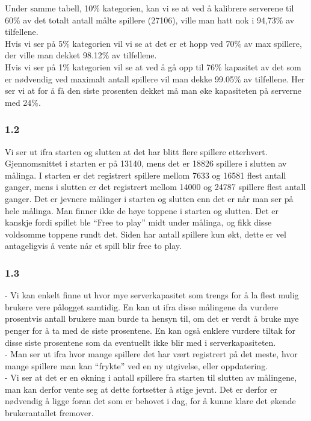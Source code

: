 \documentclass[a4paper, norsk, 12pt]{article}
\begin{document}
Under samme tabell, 10\% kategorien, kan vi se at ved å kalibrere serverene til 60\% av det totalt antall målte spillere (27106), ville man hatt nok i 94,73\% av tilfellene. \\

Hvis vi ser på 5\% kategorien vil vi se at det er et hopp ved 70\% av max spillere, der ville man dekket 98.12\% av tilfellene. \\

Hvis vi ser på 1\% kategorien vil se at ved å gå opp til 76\% kapasitet av det som er nødvendig ved maximalt antall spillere vil man dekke 99.05\% av tilfellene. Her ser vi at for å få den siste prosenten dekket må man øke kapasiteten på serverne med 24\%.

\subsubsection*{1.2}
Vi ser ut ifra starten og slutten at det har blitt flere spillere etterhvert. Gjennomsnittet i starten er på 13140, mens det er 18826 spillere i slutten av målinga. I starten er det registrert spillere mellom 7633 og 16581 flest antall ganger, mens i slutten er det registrert mellom 14000 og 24787 spillere flest antall ganger. Det er jevnere målinger i starten og slutten enn det er når man ser på hele målinga.  Man finner ikke de høye toppene i starten og slutten. Det er kanskje fordi spillet ble “Free to play” midt under målinga, og fikk disse voldsomme toppene rundt det. Siden har antall spillere kun økt, dette er vel antageligvis å vente når et spill blir free to play.

\subsubsection*{1.3}
- Vi kan enkelt finne ut hvor mye serverkapasitet som trengs for å la flest mulig brukere vere pålogget samtidig. En kan ut ifra disse målingene da vurdere prosentvis antall brukere man burde ta hensyn til, om det er verdt å bruke mye penger for å ta med de siste prosentene. En kan også enklere vurdere tiltak for disse siste prosentene som da eventuellt ikke blir med i serverkapasiteten.\\

- Man ser ut ifra hvor mange spillere det har vært registrert på det meste, hvor mange spillere man kan “frykte” ved en ny utgivelse, eller oppdatering.\\

- Vi ser at det er en økning i antall spillere fra starten til slutten av målingene, man kan derfor vente seg at dette fortsetter å stige jevnt. Det er derfor er nødvendig å ligge foran det som er behovet i dag, for å kunne klare det økende brukerantallet fremover.
\end{document}
